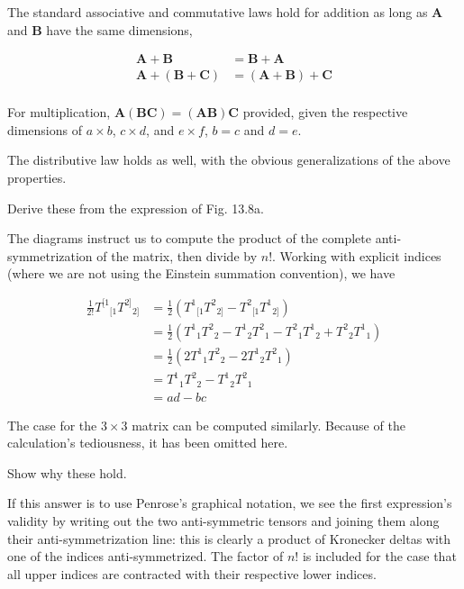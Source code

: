 \documentclass[../the-road-to-reality.tex]{subfiles}
\begin{document}
\begin{questions}
\begin{solution}
        The standard associative and commutative laws hold for addition as long as $\mathbf{A}$ and $\mathbf{B}$ have the same dimensions,

        \begin{align*}
                \mathbf{A} + \mathbf{B} &= \mathbf{B} + \mathbf{A} \\
                \mathbf{A} + (\mathbf{B} + \mathbf{C}) &= (\mathbf{A} + \mathbf{B}) + \mathbf{C} \\
        \end{align*}

        For multiplication, $\mathbf{A}(\mathbf{B}\mathbf{C}) = (\mathbf{A}\mathbf{B})\mathbf{C}$ provided, given the respective dimensions of $a \times b$, $c \times d$, and $e \times f$, $b = c$ and $d = e$.

        The distributive law holds as well, with the obvious generalizations of the above properties.
\end{solution}

\question Derive these from the expression of Fig. 13.8a.

\begin{solution}
        The diagrams instruct us to compute the product of the complete anti-symmetrization of the matrix, then divide by $n!$. Working with explicit indices (where we are not using the Einstein summation convention), we have

        \begin{align*}
                \frac{1}{2!}{T^{[1}}_{[1}{T^{2]}}_{2]} &= \frac{1}{2}({T^1}_{[1}{T^2}_{2]} - {T^2}_{[1}{T^1}_{2]}) \\
                &= \frac{1}{2}({T^1}_{1}{T^2}_{2} - {T^1}_{2}{T^2}_{1} - {T^2}_{1}{T^1}_{2} + {T^2}_{2}{T^1}_{1}) \\
                &= \frac{1}{2}(2{T^1}_{1}{T^2}_{2} - 2{T^1}_{2}{T^2}_{1}) \\
                &= {T^1}_{1}{T^2}_{2} - {T^1}_{2}{T^2}_{1} \\
                &= ad - bc
        \end{align*}

        The case for the $3\times{3}$ matrix can be computed similarly. Because of the calculation's tediousness, it has been omitted here.
\end{solution}

\question Show why these hold.

\begin{solution}
        If this answer is to use Penrose's graphical notation, we see the first expression's validity by writing out the two anti-symmetric tensors and joining them along their anti-symmetrization line: this is clearly a product of Kronecker deltas with one of the indices anti-symmetrized. The factor of $n!$ is included for the case that all upper indices are contracted with their respective lower indices.


\end{solution}
\end{questions}
\end{document}

